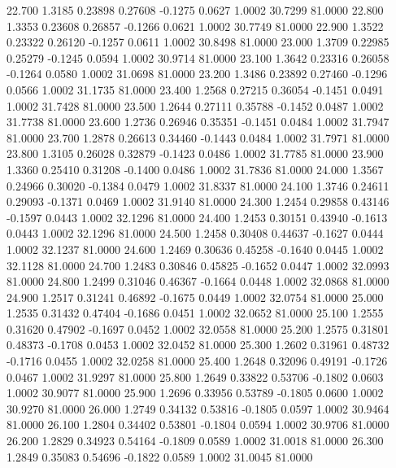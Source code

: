   22.700   1.3185   0.23898   0.27608  -0.1275   0.0627   1.0002  30.7299  81.0000
  22.800   1.3353   0.23608   0.26857  -0.1266   0.0621   1.0002  30.7749  81.0000
  22.900   1.3522   0.23322   0.26120  -0.1257   0.0611   1.0002  30.8498  81.0000
  23.000   1.3709   0.22985   0.25279  -0.1245   0.0594   1.0002  30.9714  81.0000
  23.100   1.3642   0.23316   0.26058  -0.1264   0.0580   1.0002  31.0698  81.0000
  23.200   1.3486   0.23892   0.27460  -0.1296   0.0566   1.0002  31.1735  81.0000
  23.400   1.2568   0.27215   0.36054  -0.1451   0.0491   1.0002  31.7428  81.0000
  23.500   1.2644   0.27111   0.35788  -0.1452   0.0487   1.0002  31.7738  81.0000
  23.600   1.2736   0.26946   0.35351  -0.1451   0.0484   1.0002  31.7947  81.0000
  23.700   1.2878   0.26613   0.34460  -0.1443   0.0484   1.0002  31.7971  81.0000
  23.800   1.3105   0.26028   0.32879  -0.1423   0.0486   1.0002  31.7785  81.0000
  23.900   1.3360   0.25410   0.31208  -0.1400   0.0486   1.0002  31.7836  81.0000
  24.000   1.3567   0.24966   0.30020  -0.1384   0.0479   1.0002  31.8337  81.0000
  24.100   1.3746   0.24611   0.29093  -0.1371   0.0469   1.0002  31.9140  81.0000
  24.300   1.2454   0.29858   0.43146  -0.1597   0.0443   1.0002  32.1296  81.0000
  24.400   1.2453   0.30151   0.43940  -0.1613   0.0443   1.0002  32.1296  81.0000
  24.500   1.2458   0.30408   0.44637  -0.1627   0.0444   1.0002  32.1237  81.0000
  24.600   1.2469   0.30636   0.45258  -0.1640   0.0445   1.0002  32.1128  81.0000
  24.700   1.2483   0.30846   0.45825  -0.1652   0.0447   1.0002  32.0993  81.0000
  24.800   1.2499   0.31046   0.46367  -0.1664   0.0448   1.0002  32.0868  81.0000
  24.900   1.2517   0.31241   0.46892  -0.1675   0.0449   1.0002  32.0754  81.0000
  25.000   1.2535   0.31432   0.47404  -0.1686   0.0451   1.0002  32.0652  81.0000
  25.100   1.2555   0.31620   0.47902  -0.1697   0.0452   1.0002  32.0558  81.0000
  25.200   1.2575   0.31801   0.48373  -0.1708   0.0453   1.0002  32.0452  81.0000
  25.300   1.2602   0.31961   0.48732  -0.1716   0.0455   1.0002  32.0258  81.0000
  25.400   1.2648   0.32096   0.49191  -0.1726   0.0467   1.0002  31.9297  81.0000
  25.800   1.2649   0.33822   0.53706  -0.1802   0.0603   1.0002  30.9077  81.0000
  25.900   1.2696   0.33956   0.53789  -0.1805   0.0600   1.0002  30.9270  81.0000
  26.000   1.2749   0.34132   0.53816  -0.1805   0.0597   1.0002  30.9464  81.0000
  26.100   1.2804   0.34402   0.53801  -0.1804   0.0594   1.0002  30.9706  81.0000
  26.200   1.2829   0.34923   0.54164  -0.1809   0.0589   1.0002  31.0018  81.0000
  26.300   1.2849   0.35083   0.54696  -0.1822   0.0589   1.0002  31.0045  81.0000
